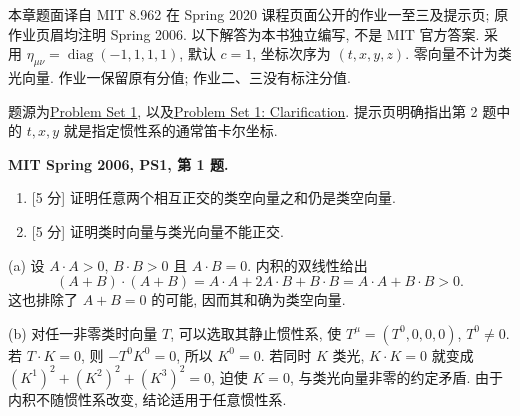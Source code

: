 
本章题面译自 MIT 8.962 在 Spring 2020 课程页面公开的作业一至三及提示页; 原作业页眉均注明 Spring 2006. 以下解答为本书独立编写, 不是 MIT 官方答案. 采用 $\eta_{\mu\nu}=\operatorname{diag}(-1,1,1,1)$, 默认 $c=1$, 坐标次序为 $(t,x,y,z)$. 零向量不计为类光向量. 作业一保留原有分值; 作业二、三没有标注分值.


题源为\href{https://ocw.mit.edu/courses/8-962-general-relativity-spring-2020/resources/mit8_962s20_pset01/}{Problem Set 1}, 以及\href{https://ocw.mit.edu/courses/8-962-general-relativity-spring-2020/resources/mit8_962s20_pset01_hint/}{Problem Set 1: Clarification}. 提示页明确指出第 2 题中的 $t,x,y$ 就是指定惯性系的通常笛卡尔坐标.

\begin{exercise}
\textbf{MIT Spring 2006, PS1, 第 1 题.}
\begin{enumerate}[label=(\alph*)]
\item \textnormal{[5 分]} 证明任意两个相互正交的类空向量之和仍是类空向量.
\item \textnormal{[5 分]} 证明类时向量与类光向量不能正交.
\end{enumerate}
\end{exercise}
\begin{solution}
(a) 设 $A\cdot A>0$, $B\cdot B>0$ 且 $A\cdot B=0$. 内积的双线性给出
\[
 (A+B)\cdot(A+B)=A\cdot A+2A\cdot B+B\cdot B
 =A\cdot A+B\cdot B>0.
\]
这也排除了 $A+B=0$ 的可能, 因而其和确为类空向量.

(b) 对任一非零类时向量 $T$, 可以选取其静止惯性系, 使 $T^\mu=(T^0,0,0,0)$, $T^0\ne0$. 若 $T\cdot K=0$, 则 $-T^0K^0=0$, 所以 $K^0=0$. 若同时 $K$ 类光, $K\cdot K=0$ 就变成 $(K^1)^2+(K^2)^2+(K^3)^2=0$, 迫使 $K=0$, 与类光向量非零的约定矛盾. 由于内积不随惯性系改变, 结论适用于任意惯性系.
\end{solution}

